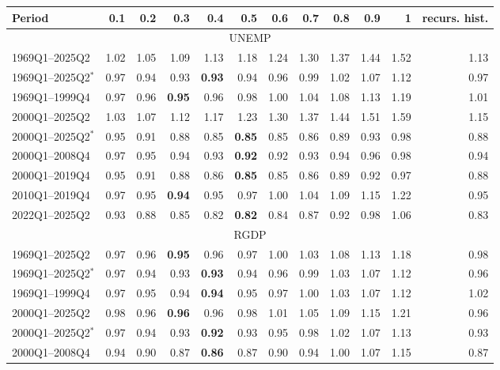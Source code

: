 \begin{tabular}{lrrrrrrrrrrr}
\hline
Period & 0.1 & 0.2 & 0.3 & 0.4 & 0.5 & 0.6 & 0.7 & 0.8 & 0.9 & 1 & recurs. hist. \\
\hline
\multicolumn{12}{c}{UNEMP} \\
1969Q1--2025Q2 & 1.02 & 1.05 & 1.09 & 1.13 & 1.18 & 1.24 & 1.30 & 1.37 & 1.44 & 1.52 & 1.13 \\
1969Q1--2025Q2$^*$ & 0.97 & 0.94 & 0.93 & \textbf{0.93} & 0.94 & 0.96 & 0.99 & 1.02 & 1.07 & 1.12 & 0.97 \\
1969Q1--1999Q4 & 0.97 & 0.96 & \textbf{0.95} & 0.96 & 0.98 & 1.00 & 1.04 & 1.08 & 1.13 & 1.19 & 1.01 \\
2000Q1--2025Q2 & 1.03 & 1.07 & 1.12 & 1.17 & 1.23 & 1.30 & 1.37 & 1.44 & 1.51 & 1.59 & 1.15 \\
2000Q1--2025Q2$^*$ & 0.95 & 0.91 & 0.88 & 0.85 & \textbf{0.85} & 0.85 & 0.86 & 0.89 & 0.93 & 0.98 & 0.88 \\
2000Q1--2008Q4 & 0.97 & 0.95 & 0.94 & 0.93 & \textbf{0.92} & 0.92 & 0.93 & 0.94 & 0.96 & 0.98 & 0.94 \\
2000Q1--2019Q4 & 0.95 & 0.91 & 0.88 & 0.86 & \textbf{0.85} & 0.85 & 0.86 & 0.89 & 0.92 & 0.97 & 0.88 \\
2010Q1--2019Q4 & 0.97 & 0.95 & \textbf{0.94} & 0.95 & 0.97 & 1.00 & 1.04 & 1.09 & 1.15 & 1.22 & 0.95 \\
2022Q1--2025Q2 & 0.93 & 0.88 & 0.85 & 0.82 & \textbf{0.82} & 0.84 & 0.87 & 0.92 & 0.98 & 1.06 & 0.83 \\
\hline
\multicolumn{12}{c}{RGDP} \\
1969Q1--2025Q2 & 0.97 & 0.96 & \textbf{0.95} & 0.96 & 0.97 & 1.00 & 1.03 & 1.08 & 1.13 & 1.18 & 0.98 \\
1969Q1--2025Q2$^*$ & 0.97 & 0.94 & 0.93 & \textbf{0.93} & 0.94 & 0.96 & 0.99 & 1.03 & 1.07 & 1.12 & 0.96 \\
1969Q1--1999Q4 & 0.97 & 0.95 & 0.94 & \textbf{0.94} & 0.95 & 0.97 & 1.00 & 1.03 & 1.07 & 1.12 & 1.02 \\
2000Q1--2025Q2 & 0.98 & 0.96 & \textbf{0.96} & 0.96 & 0.98 & 1.01 & 1.05 & 1.09 & 1.15 & 1.21 & 0.96 \\
2000Q1--2025Q2$^*$ & 0.97 & 0.94 & 0.93 & \textbf{0.92} & 0.93 & 0.95 & 0.98 & 1.02 & 1.07 & 1.13 & 0.93 \\
2000Q1--2008Q4 & 0.94 & 0.90 & 0.87 & \textbf{0.86} & 0.87 & 0.90 & 0.94 & 1.00 & 1.07 & 1.15 & 0.87 \\

\end{tabular}
